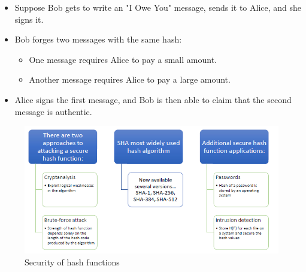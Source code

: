 \documentclass{article}
\begin{document}
\begin{itemize}
\begin{itemize}
\begin{itemize}
                                                \item Suppose Bob gets to write an "I Owe You" message, sends it to Alice, and she signs it.
                                                \item Bob forges two messages with the same hash:
                                                \begin{itemize}
                                                    \item One message requires Alice to pay a small amount.
                                                    \item Another message requires Alice to pay a large amount.
                                                \end{itemize}
                                                \item Alice signs the first message, and Bob is then able to claim that the second message is authentic.
                                            \end{itemize}
                                        \end{itemize}
                                    
                                \end{itemize}
                                \begin{figure}[h]
                                    \begin{center}
                                        \includegraphics{../immagini/security_hash.png}
                                    \end{center}
                                    \caption{Security of hash functions}
                                \end{figure}
\end{document}
